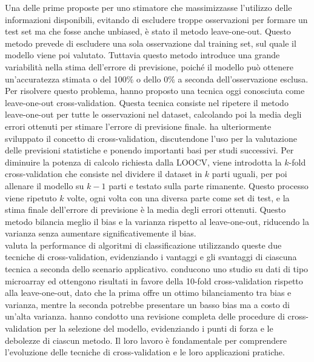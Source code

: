 Una delle prime proposte per uno stimatore che massimizzasse l’utilizzo delle informazioni disponibili, evitando di escludere troppe osservazioni per formare un test set ma che fosse anche unbiased, è stato il metodo leave-one-out. Questo metodo prevede di escludere una sola osservazione dal training set, sul quale il modello viene poi valutato. Tuttavia questo metodo introduce una grande variabilità nella stima dell’errore di previsione, poiché il modello può ottenere un’accuratezza stimata o del 100\% o dello 0\% a seconda dell’osservazione esclusa.\\
Per risolvere questo problema, \textcite{lachenbruch1968} hanno proposto una tecnica oggi conosciuta come leave-one-out cross-validation. Questa tecnica consiste nel ripetere il metodo leave-one-out per tutte le osservazioni nel dataset, calcolando poi la media degli errori ottenuti per stimare l’errore di previsione finale. \textcite{stone} ha ulteriormente sviluppato il concetto di cross-validation, discutendone l’uso per la valutazione delle previsioni statistiche e ponendo importanti basi per studi successivi. Per diminuire la potenza di calcolo richiesta dalla LOOCV, viene introdotta la $k$-fold cross-validation che consiste nel dividere il dataset in $k$ parti uguali, per poi allenare il modello su $k-1$ parti e testato sulla parte rimanente. Questo processo viene ripetuto $k$ volte, ogni volta con una diversa parte come set di test, e la stima finale dell’errore di previsione è la media degli errori ottenuti. Questo metodo bilancia meglio il bias e la varianza rispetto al leave-one-out, riducendo la varianza senza aumentare significativemente il bias.\\
\textcite{wongTT} valuta la performance di algoritmi di classificazione utilizzando queste due tecniche di cross-validation, evidenziando i vantaggi e gli svantaggi di ciascuna tecnica a seconda dello scenario applicativo. \textcite{mclachlan} conducono uno studio su dati di tipo microarray ed ottengono risultati in favore della 10-fold cross-validation rispetto alla leave-one-out, dato che la prima offre un ottimo bilanciamento tra bias e varianza, mentre la seconda potrebbe presentare un basso bias ma a costo di un’alta varianza. \textcite{celisse} hanno condotto una revisione completa delle procedure di cross-validation per la selezione del modello, evidenziando i punti di forza e le debolezze di ciascun metodo. Il loro lavoro è fondamentale per comprendere l'evoluzione delle tecniche di cross-validation e le loro applicazioni pratiche.



